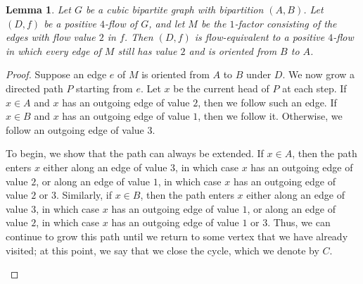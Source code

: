 \documentclass[a4paper,12pt]{article}
\theoremstyle{plain}
\newtheorem{lem}[theorem]{Lemma}
\theoremstyle{definition}
\begin{document}
\begin{lem}\label{orient-M-lem}
Let $G$ be a cubic bipartite graph with bipartition $(A,B)$. Let $(D,f)$ be a positive
$4$-flow of $G$, and let $M$ be the $1$-factor consisting of the edges with flow value $2$ in $f$. Then $(D,f)$ is flow-equivalent to a positive $4$-flow in which every edge of $M$ still has value $2$ and is oriented from $B$ to $A$.
\end{lem}
\begin{proof}
	Suppose an edge $e$ of $M$ is oriented from $A$ to $B$ under $D$.  
    We now grow a directed path $P$ starting from $e$. 
    Let $x$ be the current head of $P$ at each step.
	If $x\in A$ and $x$ has an outgoing edge of value $2$, then we follow such an edge. 
	If $x\in B$ and $x$ has an outgoing edge of value $1$, then we follow it.   
	Otherwise, we follow an outgoing edge of value $3$.
    
    To begin, we show that the path can always be extended. 
	If $x\in A$, then the path enters $x$ either along an edge of value $3$, in which case $x$ has an outgoing edge of value $2$, or along an edge of value $1$, in which case $x$ has an outgoing edge of value $2$ or $3$. Similarly, if $x\in B$, then the path enters $x$ either along an edge of value $3$, in which case $x$ has an outgoing edge of value $1$, or along an edge of value $2$, in which case $x$ has an outgoing edge of value $1$ or $3$.
%
	Thus, we can continue to grow this path until we return to some vertex that we have already visited; at this point, we say that we close the cycle, which we denote by $C$.  
    \begin{figure}[!t]
\begin{tikzpicture}[semithick,
    scale=.8, xscale=2, 
    vertex/.style={
        circle, 
        draw, 
        fill=white, 
        minimum size=3pt,  %
        inner sep=0pt
    },
    directed edge/.style={
        decoration={
            markings,
            mark=at position 0.3 with {\arrow{stealth}}
        },
        postaction={decorate}
    },
    weight label/.style={
        draw=none, 
        fill=white, 
        inner sep=1.5pt,   %
        font=\small,       %
        pos=0.7
    }
]


\end{tikzpicture}
\end{figure}
\end{proof}
\end{document}

